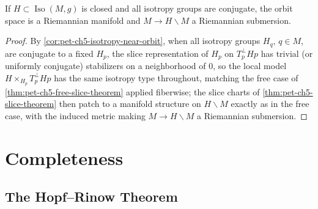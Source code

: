 \begin{corollary}
  \label{cor:pet-ch5-conjugate-isotropy-manifold}
  If $H\subset\operatorname{Iso}(M,g)$ is closed and all isotropy groups are
  conjugate, the orbit space is a Riemannian manifold and $M\to H\backslash M$ a
  Riemannian submersion.
\end{corollary}
\begin{proof}
  By \cref{cor:pet-ch5-isotropy-near-orbit}, when all isotropy groups $H_q$,
  $q\in M$, are conjugate to a fixed $H_p$, the slice representation of $H_p$ on
  $T_p^\perp Hp$ has trivial (or uniformly conjugate) stabilizers on a neighborhood
  of $0$, so the local model $H\times_{H_p}T_p^\perp Hp$ has the same isotropy type
  throughout, matching the free case of \cref{thm:pet-ch5-free-slice-theorem}
  applied fiberwise; the slice charts of \cref{thm:pet-ch5-slice-theorem} then patch
  to a manifold structure on $H\backslash M$ exactly as in the free case, with the
  induced metric making $M\to H\backslash M$ a Riemannian submersion.
\end{proof}

\section{Completeness}

\subsection{The Hopf–Rinow Theorem}

